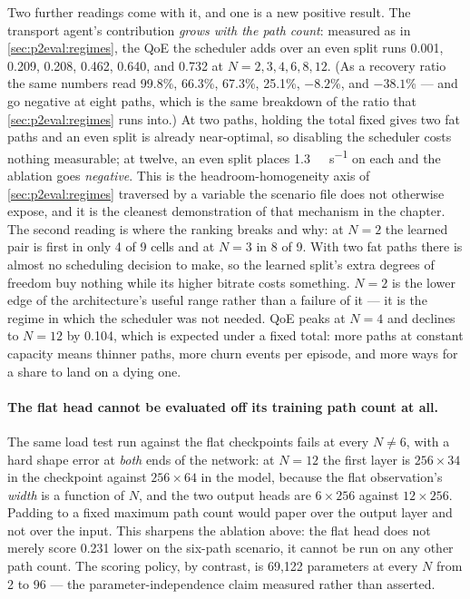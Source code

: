Two further readings come with it, and one is a new positive result. The transport agent's contribution
\emph{grows with the path count}: measured as in \cref{sec:p2eval:regimes}, the QoE the scheduler adds
over an even split runs 0.001, 0.209, 0.208, 0.462, 0.640, and 0.732 at $N = 2, 3, 4, 6, 8, 12$. (As a
recovery ratio the same numbers read 99.8\%, 66.3\%, 67.3\%, 25.1\%, $-8.2$\%, and $-38.1$\% --- and go
negative at eight paths, which is the same breakdown of the ratio that
\cref{sec:p2eval:regimes} runs into.) At two paths,
holding the total fixed gives two fat paths and an even split is already near-optimal, so disabling the
scheduler costs nothing measurable; at twelve, an even split places \SI{1.3}{\mega\bit\per\second} on
each and the ablation goes \emph{negative}. This is the headroom-homogeneity axis of
\cref{sec:p2eval:regimes} traversed by a variable the scenario file does not otherwise expose, and it is
the cleanest demonstration of that mechanism in the chapter. The second reading is where the ranking
breaks and why: at $N = 2$ the learned pair is first in only 4 of 9 cells and at $N = 3$ in 8 of 9. With
two fat paths there is almost no scheduling decision to make, so the learned split's extra degrees of
freedom buy nothing while its higher bitrate costs something. $N = 2$ is the lower edge of the
architecture's useful range rather than a failure of it --- it is the regime in which the scheduler was
not needed. QoE peaks at $N = 4$ and declines to $N = 12$ by 0.104, which is expected under a fixed
total: more paths at constant capacity means thinner paths, more churn events per episode, and more ways
for a share to land on a dying one.

\paragraph{The flat head cannot be evaluated off its training path count at all.} The same load test
run against the flat checkpoints fails at every $N \neq 6$, with a hard shape error at \emph{both} ends
of the network: at $N = 12$ the first layer is $256 \times 34$ in the checkpoint against $256 \times 64$
in the model, because the flat observation's \emph{width} is a function of $N$, and the two output heads
are $6 \times 256$ against $12 \times 256$. Padding to a fixed maximum path count would paper over the
output layer and not over the input. This sharpens the ablation above: the flat head does not merely
score 0.231 lower on the six-path scenario, it cannot be run on any other path count. The scoring
policy, by contrast, is 69,122 parameters at every $N$ from 2 to 96 --- the parameter-independence claim
measured rather than asserted.

